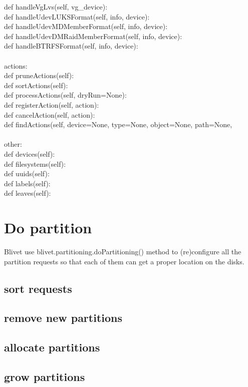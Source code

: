 \documentclass{article}
\begin{document}
    def handleVgLvs(self, vg\_device):\\
    def handleUdevLUKSFormat(self, info, device):\\
    def handleUdevMDMemberFormat(self, info, device):\\
    def handleUdevDMRaidMemberFormat(self, info, device):\\
    def handleBTRFSFormat(self, info, device):\\
\\
actions:\\
    def pruneActions(self):\\
    def sortActions(self):\\
    def processActions(self, dryRun=None):\\
    def registerAction(self, action):\\
    def cancelAction(self, action):\\
    def findActions(self, device=None, type=None, object=None, path=None,\\
\\
other:\\
    def devices(self):\\
    def filesystems(self):\\
    def uuids(self):\\
    def labels(self):\\
    def leaves(self):\\



\section{Do partition}

Blivet use blivet.partitioning.doPartitioning() method to (re)configure all the
partition requests so that each of them can get a proper location on the disks.
\subsection{sort requests}
\subsection{remove new partitions}
\subsection{allocate partitions}
\subsection{grow partitions}
\end{document}
